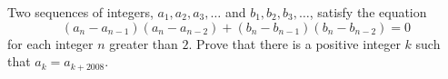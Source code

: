 Two sequences of integers, $ a_1, a_2, a_3, \ldots$ and $ b_1, b_2, b_3, \ldots$, satisfy the equation \[ (a_n - a_{n - 1})(a_n - a_{n - 2}) + (b_n - b_{n - 1})(b_n - b_{n - 2}) = 0\] for each integer $ n$ greater than $ 2$. Prove that there is a positive integer $ k$ such that $ a_k = a_{k + 2008}$.